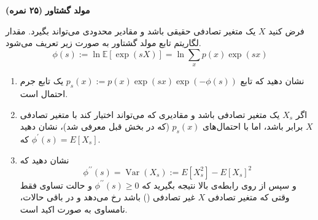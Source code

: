 \Large \textbf{مولد گشتاور}
\large \textbf{(۲۵ نمره)}

\normalsize \vspace{0.5cm}

فرض کنید 
$X$
یک متغیر تصادفی حقیقی باشد و مقادیر محدودی می‌تواند بگیرد.
مقدار لگاریتم تابع مولد گشتاور به صورت زیر تعریف می‌شود.
$$\phi(s):=\ln \mathbb{E}[\exp (s X)]=\ln \sum_{x} p(x) \exp (s x)$$
\begin{enumerate}[label=(\alph*)]
	\item
	
نشان دهید که
تابع
$p_{s}(x):=p(x) \exp (s x) \exp (-\phi(s))$ 
یک تابع جرم احتمال است.
	
	\item 
	
اگر
$X_s$
یک متغیر تصادفی باشد و مقادیری که می‌تواند اختیار کند با متغیر تصادفی
$X$
برابر باشد، اما با احتمال‌های
$p_{s}(x)$ (که در بخش قبل معرفی شد)،
نشان دهید که
$\phi^{\prime}(s)=E\left[X_{s}\right]$.

	\item


نشان دهید که
$$\phi^{\prime \prime}(s)=\operatorname{Var}\left(X_{s}\right):=E\left[X_{s}^{2}\right]-E\left[X_{s}\right]^{2}$$
و سپس از روی رابطه‌ی بالا نتیجه بگیرید که 
$\phi^{\prime \prime}(s) \geq 0$
و حالت تساوی فقط وقتی که متغیر تصادفی
$X$
غیر تصادفی
()
باشد رخ می‌دهد و در باقی حالات، نامساوی به صورت اکید است.


\end{enumerate}

